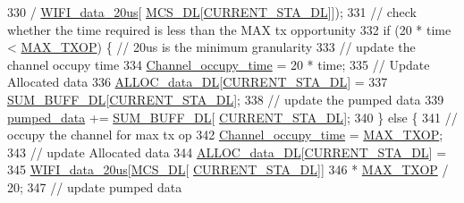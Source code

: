 \begin{DoxyCode}
330                                                 / \hyperlink{classAP_acbd517e31b830c7aebf62f9ea9635f93}{WIFI\_data\_20us}[
      \hyperlink{classAP_a7b8604e8bed67e0abef14f54ba55ec19}{MCS\_DL}[\hyperlink{classAP_aabddb8414a6a9ecdd51e7e2a03310eb9}{CURRENT\_STA\_DL}]]);
331                         \textcolor{comment}{// check whether the time required is less than the MAX tx opportunity}
332                         \textcolor{keywordflow}{if} (20 * time < \hyperlink{classAP_a0952981af3bebf7dcc9fabe94875dc7b}{MAX\_TXOP}) \{ \textcolor{comment}{// 20us is the minimum granularity}
333                             \textcolor{comment}{// update the channel occupy time}
334                             \hyperlink{classAP_a2c168786c0400fa590bed7fabbca741e}{Channel\_occupy\_time} = 20 * time;
335                             \textcolor{comment}{// Update Allocated data}
336                             \hyperlink{classAP_a88e8d95cfbca5d598ec6cd900efa2b30}{ALLOC\_data\_DL}[\hyperlink{classAP_aabddb8414a6a9ecdd51e7e2a03310eb9}{CURRENT\_STA\_DL}] =
337                                     \hyperlink{classAP_aaff6ce72b09dc955c0aaff3dc9fa0f04}{SUM\_BUFF\_DL}[\hyperlink{classAP_aabddb8414a6a9ecdd51e7e2a03310eb9}{CURRENT\_STA\_DL}];
338                             \textcolor{comment}{// update the pumped data}
339                             \hyperlink{classAP_ae7f2e09d8692bea041bbc7ff00521795}{pumped\_data} += \hyperlink{classAP_aaff6ce72b09dc955c0aaff3dc9fa0f04}{SUM\_BUFF\_DL}[
      \hyperlink{classAP_aabddb8414a6a9ecdd51e7e2a03310eb9}{CURRENT\_STA\_DL}];
340                         \} \textcolor{keywordflow}{else} \{
341                             \textcolor{comment}{// occupy the channel for max tx op}
342                             \hyperlink{classAP_a2c168786c0400fa590bed7fabbca741e}{Channel\_occupy\_time} = \hyperlink{classAP_a0952981af3bebf7dcc9fabe94875dc7b}{MAX\_TXOP};
343                             \textcolor{comment}{// update Allocated data}
344                             \hyperlink{classAP_a88e8d95cfbca5d598ec6cd900efa2b30}{ALLOC\_data\_DL}[\hyperlink{classAP_aabddb8414a6a9ecdd51e7e2a03310eb9}{CURRENT\_STA\_DL}] =
345                                     \hyperlink{classAP_acbd517e31b830c7aebf62f9ea9635f93}{WIFI\_data\_20us}[\hyperlink{classAP_a7b8604e8bed67e0abef14f54ba55ec19}{MCS\_DL}[
      \hyperlink{classAP_aabddb8414a6a9ecdd51e7e2a03310eb9}{CURRENT\_STA\_DL}]]
346                                             * \hyperlink{classAP_a0952981af3bebf7dcc9fabe94875dc7b}{MAX\_TXOP} / 20;
347                             \textcolor{comment}{// update pumped data}

\end{DoxyCode}
